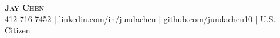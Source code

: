 
\begin{center}
    \textbf{\Huge \scshape Jay Chen} \\ \vspace{1pt}
    \small 412-716-7452 \hspace{1pt} $|$
    \hspace{1pt} \href{https://linkedin.com/in/jundachen}{\underline{linkedin.com/in/jundachen}} \hspace{1pt} $|$
    \hspace{1pt} \href{https://github.com/jundachen10}{\underline{github.com/jundachen10}} \hspace{1pt} $|$
    \hspace{1pt} U.S. Citizen \hspace{1pt}
    \vspace{-3pt}
\end{center}